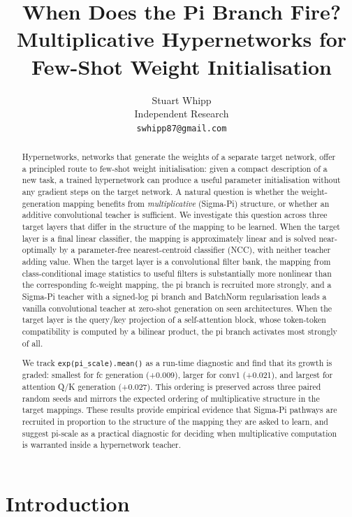\documentclass{article}
\title{When Does the Pi Branch Fire?\\
Multiplicative Hypernetworks for Few-Shot Weight Initialisation}
\author{%
  Stuart Whipp\\
  Independent Research\\
  \texttt{swhipp87@gmail.com}
}
\begin{document}
\maketitle

\begin{abstract}
Hypernetworks, networks that generate the weights of a separate target network, offer a principled route to few-shot weight initialisation: given a compact description of a new task, a trained hypernetwork can produce a useful parameter initialisation without any gradient steps on the target network. A natural question is whether the weight-generation mapping benefits from \emph{multiplicative} (Sigma-Pi) structure, or whether an additive convolutional teacher is sufficient. We investigate this question across three target layers that differ in the structure of the mapping to be learned. When the target layer is a final linear classifier, the mapping is approximately linear and is solved near-optimally by a parameter-free nearest-centroid classifier (NCC), with neither teacher adding value. When the target layer is a convolutional filter bank, the mapping from class-conditional image statistics to useful filters is substantially more nonlinear than the corresponding fc-weight mapping, the pi branch is recruited more strongly, and a Sigma-Pi teacher with a signed-log pi branch and BatchNorm regularisation leads a vanilla convolutional teacher at zero-shot generation on seen architectures. When the target layer is the query/key projection of a self-attention block, whose token-token compatibility is computed by a bilinear product, the pi branch activates most strongly of all.

We track \texttt{exp(pi\_scale).mean()} as a run-time diagnostic and find that its growth is graded: smallest for fc generation (+0.009), larger for conv1 (+0.021), and largest for attention Q/K generation (+0.027). This ordering is preserved across three paired random seeds and mirrors the expected ordering of multiplicative structure in the target mappings. These results provide empirical evidence that Sigma-Pi pathways are recruited in proportion to the structure of the mapping they are asked to learn, and suggest pi-scale as a practical diagnostic for deciding when multiplicative computation is warranted inside a hypernetwork teacher.

\end{abstract}

\section{Introduction}\label{introduction}
\end{document}
